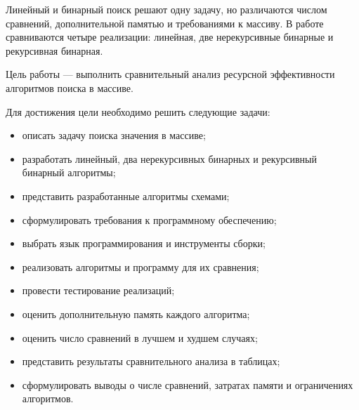 Линейный и бинарный поиск решают одну задачу, но различаются числом сравнений, дополнительной памятью и требованиями к массиву. В работе сравниваются четыре реализации: линейная, две нерекурсивные бинарные и рекурсивная бинарная.

Цель работы --- выполнить сравнительный анализ ресурсной эффективности алгоритмов поиска в массиве.

Для достижения цели необходимо решить следующие задачи:
\begin{itemize}
\item описать задачу поиска значения в массиве;
\item разработать линейный, два нерекурсивных бинарных и рекурсивный бинарный алгоритмы;
\item представить разработанные алгоритмы схемами;
\item сформулировать требования к программному обеспечению;
\item выбрать язык программирования и инструменты сборки;
\item реализовать алгоритмы и программу для их сравнения;
\item провести тестирование реализаций;
\item оценить дополнительную память каждого алгоритма;
\item оценить число сравнений в лучшем и худшем случаях;
\item представить результаты сравнительного анализа в таблицах;
\item сформулировать выводы о числе сравнений, затратах памяти и ограничениях алгоритмов.
\end{itemize}

